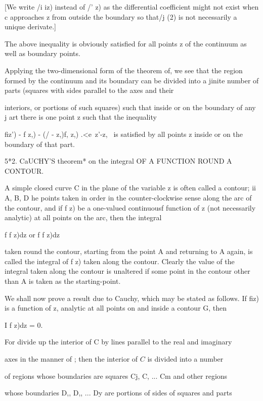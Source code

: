 [We write /i iz) instead of /' z) as the differential coefficient
might not exist when c approaches z from outside the boundary so
that/j (2) is not necessarily a unique derivate.]

The above inequality is obviously satisfied for all points z of the
continuum as well as boundary points.

Applying the two-dimensional form of the theorem of, we see that
the region formed by the continuum and its boundary can be divided
into a jinite number of parts (squares with sides parallel to the axes
and their

%
%

interiors, or portions of such squares) such that inside or on the
boundary of any j art there is one point z such that the inequality

fiz') - f z,) - (/ - z,)f, z,) .<e\ z'-z, \ is satisfied by all points
z inside or on the boundary of that part.

5*2. CaUCHY'S theorem* on the integral OF A FUNCTION ROUND A CONTOUR.

A simple closed curve C in the plane of the variable z is often called
a contour; ii A, B, D he points taken in order in the
counter-clockwise sense along the arc of the contour, and if f z) be a
one-valued continuousf function of z (not necessarily analytic) at all
points on the arc, then the integral

f f z)dz or f f z)dz

taken round the contour, starting from the point A and returning to A
again, is called the integral of f z) taken along the contour. Clearly
the value of the integral taken along the contour is unaltered if some
point in the contour other than A is taken as the starting-point.

We shall now prove a result due to Cauchy, which may be stated as
follows. If fiz) is a function of z, analytic at all points on and
inside a contour G, then

I f z)dz = 0.

For divide up the interior of C by lines parallel to the real and
imaginary

axes in the manner of ; then the interior
of $C$ is divided into a number

of regions whose boundaries are squares Cj, C, ... Cm and other
regions

whose boundaries D,, D,, ... Dy are portions of sides of squares and
parts

